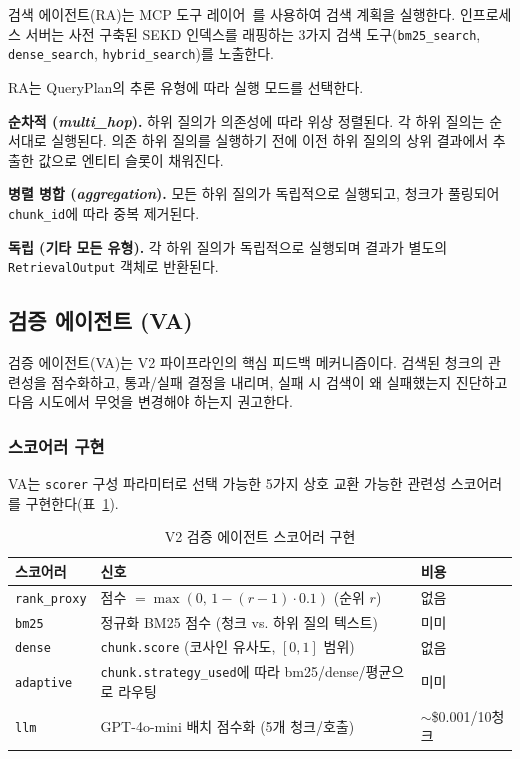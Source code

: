검색 에이전트(RA)는 MCP 도구 레이어~\citep{mcp2024}를 사용하여 검색 계획을 실행한다. 인프로세스 서버는 사전 구축된 SEKD 인덱스를 래핑하는 3가지 검색 도구(\texttt{bm25\_search}, \texttt{dense\_search}, \texttt{hybrid\_search})를 노출한다.

RA는 QueryPlan의 추론 유형에 따라 실행 모드를 선택한다.

\textbf{순차적 (\textit{multi\_hop}).} 하위 질의가 의존성에 따라 위상 정렬된다. 각 하위 질의는 순서대로 실행된다. 의존 하위 질의를 실행하기 전에 이전 하위 질의의 상위 결과에서 추출한 값으로 엔티티 슬롯이 채워진다.

\textbf{병렬 병합 (\textit{aggregation}).} 모든 하위 질의가 독립적으로 실행되고, 청크가 풀링되어 \texttt{chunk\_id}에 따라 중복 제거된다.

\textbf{독립 (기타 모든 유형).} 각 하위 질의가 독립적으로 실행되며 결과가 별도의 \texttt{RetrievalOutput} 객체로 반환된다.

\subsection{검증 에이전트 (VA)}
\label{subsec:v2_validation_ko}

검증 에이전트(VA)는 V2 파이프라인의 핵심 피드백 메커니즘이다. 검색된 청크의 관련성을 점수화하고, 통과/실패 결정을 내리며, 실패 시 검색이 왜 실패했는지 진단하고 다음 시도에서 무엇을 변경해야 하는지 권고한다.

\subsubsection*{스코어러 구현}

VA는 \texttt{scorer} 구성 파라미터로 선택 가능한 5가지 상호 교환 가능한 관련성 스코어러를 구현한다(표~\ref{tab:v2_scorers_ko}).

\begin{table}[H]
\centering
\caption{V2 검증 에이전트 스코어러 구현}
\label{tab:v2_scorers_ko}
\begin{tabular}{lll}
\toprule
\textbf{스코어러} & \textbf{신호} & \textbf{비용} \\
\midrule
\texttt{rank\_proxy}  & 점수 $= \max(0,\, 1 - (r{-}1) \cdot 0.1)$ (순위 $r$) & 없음 \\
\texttt{bm25}         & 정규화 BM25 점수 (청크 vs. 하위 질의 텍스트) & 미미 \\
\texttt{dense}        & \texttt{chunk.score} (코사인 유사도, $[0,1]$ 범위) & 없음 \\
\texttt{adaptive}     & \texttt{chunk.strategy\_used}에 따라 bm25/dense/평균으로 라우팅 & 미미 \\
\texttt{llm}          & GPT-4o-mini 배치 점수화 (5개 청크/호출) & $\sim$\$0.001/10청크 \\
\bottomrule
\end{tabular}
\end{table}

